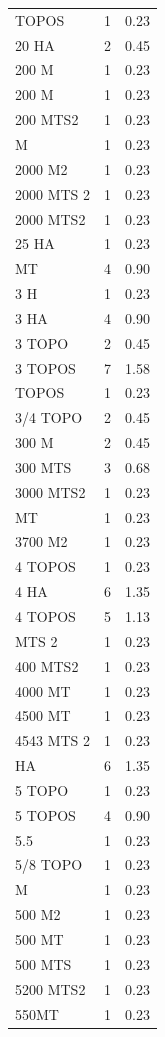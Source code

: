 \documentclass{article}\usepackage[]{graphicx}\usepackage[table]{xcolor}
\begin{document}
\begin{table}[H]
\begin{tabular}{lcl}
\addlinespace
2.5 TOPOS & 1 & 0.23\\
20 HA & 2 & 0.45\\
200  M & 1 & 0.23\\
200 M & 1 & 0.23\\
200 MTS2 & 1 & 0.23\\
\addlinespace
2000 M & 1 & 0.23\\
2000 M2 & 1 & 0.23\\
2000 MTS 2 & 1 & 0.23\\
2000 MTS2 & 1 & 0.23\\
25 HA & 1 & 0.23\\
\addlinespace
2500 MT & 4 & 0.90\\
3 H & 1 & 0.23\\
3 HA & 4 & 0.90\\
3 TOPO & 2 & 0.45\\
3 TOPOS & 7 & 1.58\\
\addlinespace
3 TOPOS & 1 & 0.23\\
3/4 TOPO & 2 & 0.45\\
300 M & 2 & 0.45\\
300 MTS & 3 & 0.68\\
3000 MTS2 & 1 & 0.23\\
\addlinespace
3400 MT & 1 & 0.23\\
3700 M2 & 1 & 0.23\\
4  TOPOS & 1 & 0.23\\
4 HA & 6 & 1.35\\
4 TOPOS & 5 & 1.13\\
\addlinespace
400 MTS 2 & 1 & 0.23\\
400 MTS2 & 1 & 0.23\\
4000 MT & 1 & 0.23\\
4500 MT & 1 & 0.23\\
4543 MTS 2 & 1 & 0.23\\
\addlinespace
5 HA & 6 & 1.35\\
5 TOPO & 1 & 0.23\\
5 TOPOS & 4 & 0.90\\
5.5 & 1 & 0.23\\
5/8 TOPO & 1 & 0.23\\
\addlinespace
500 M & 1 & 0.23\\
500 M2 & 1 & 0.23\\
500 MT & 1 & 0.23\\
500 MTS & 1 & 0.23\\
5200 MTS2 & 1 & 0.23\\
\addlinespace
550MT & 1 & 0.23\\

\end{tabular}
\end{table}
\end{document}
